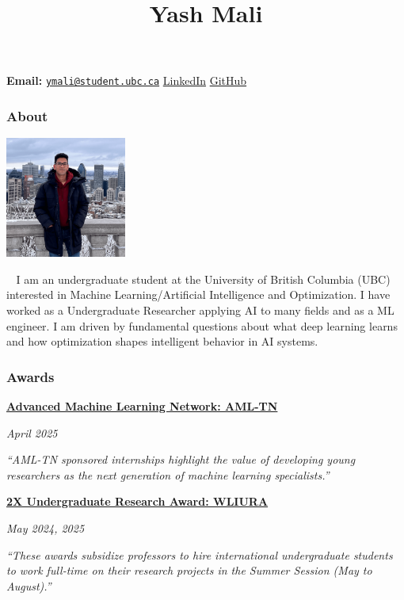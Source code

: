 \documentclass[
  11pt,
]{article}
\title{Yash Mali}
\author{}
\date{}
\begin{document}
\maketitle


\textbf{Email:}
\href{mailto:ymali@student.ubc.ca}{\nolinkurl{ymali@student.ubc.ca}}
\textbar{} \href{https://www.linkedin.com/in/yash-mali-ubc}{LinkedIn}
\textbar{} \href{https://github.com/yashm8}{GitHub}

\subsubsection{About}\label{about}

\includegraphics[width=1.5625in,height=\textheight,keepaspectratio]{images/bio-photo.png}

👋🏼 I am an undergraduate student at the University of British Columbia
(UBC) interested in Machine Learning/Artificial Intelligence and
Optimization. I have worked as a Undergraduate Researcher applying AI to
many fields and as a ML engineer. I am driven by fundamental questions
about what deep learning learns and how optimization shapes intelligent
behavior in AI systems.

\subsubsection{Awards}\label{awards}

\href{https://amltn.cs.ubc.ca/people/undergraduate-research-awards}{\textbf{Advanced
Machine Learning Network: AML-TN}}

\emph{April 2025}

\emph{``AML-TN sponsored internships highlight the value of developing
young researchers as the next generation of machine learning
specialists.''}

\href{https://students.ubc.ca/career/ubc-experiences/work-learn-international-undergraduate-research-awards/}{\textbf{2X
Undergraduate Research Award: WLIURA}}

\emph{May 2024, 2025}

\emph{``These awards subsidize professors to hire international
undergraduate students to work full-time on their research projects in
the Summer Session (May to August).''}
\end{document}
